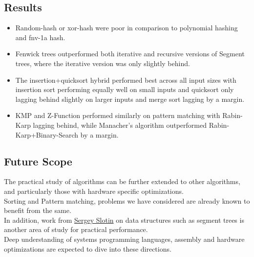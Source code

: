 \documentclass[12pt]{article}
\begin{document}
\subsection{Results}
\begin{itemize}
  \item Random-hash or xor-hash were poor in comparison to polynomial hashing and fnv-1a hash.
  \item Fenwick trees outperformed both iterative and recursive versions of Segment trees, where the iterative version was only slightly behind.
  \item The insertion+quicksort hybrid performed best across all input sizes with insertion sort performing equally well on small inputs and quicksort only lagging behind slightly on larger inputs and merge sort lagging by a margin.
  \item KMP and Z-Function performed similarly on pattern matching with Rabin-Karp lagging behind, while Manacher's algorithm outperformed Rabin-Karp+Binary-Search by a margin.
\end{itemize}

\subsection{Future Scope}
The practical study of algorithms can be further extended to other algorithms, and particularly those with hardware specific optimizations.\\
Sorting\cite{google_vectorized_quicksort} and Pattern matching\cite{stackoverflow_stringfind_complexity}, problems we have considered are already known to benefit from the same. \\
In addition, work from \hyperref[http://sereja.me/]{Sergey Slotin} on data structures\cite{sslotin_book} such as segment trees \cite{wide_segment_tree} is another area of study for practical performance. \\
Deep understanding of systems programming languages, assembly and hardware optimizations are expected to dive into these directions.
\end{document}
